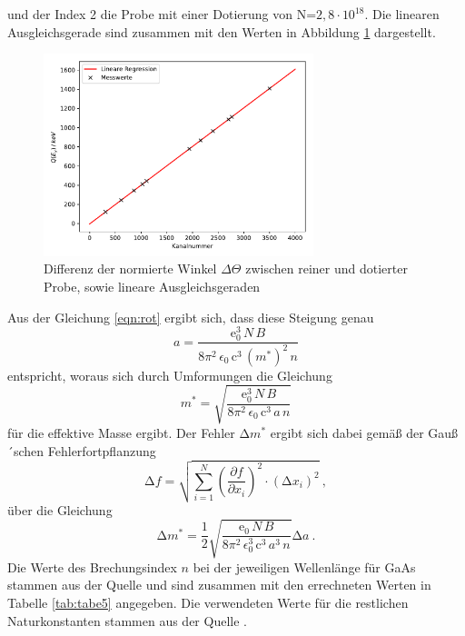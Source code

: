 und der Index 2 die Probe mit einer Dotierung von N=$2,8\cdot10^{18}$.
Die linearen Ausgleichsgerade sind zusammen mit den Werten in Abbildung \ref{fig:plot3}
dargestellt. \\
\begin{figure}
  \centering
  \includegraphics[width=0.7\textwidth]{plot3.pdf}
  \caption{Differenz der normierte Winkel $\Delta \Theta$
  zwischen reiner und dotierter Probe, sowie lineare Ausgleichsgeraden}
  \label{fig:plot3}
\end{figure}
Aus der Gleichung \eqref{eqn:rot} ergibt sich, dass diese Steigung genau
\begin{equation}
  a=\frac{\text{e}_0^3\,N\,B}{8\pi^2\,\epsilon_0\,\text{c}^3\,(m^*)^2\,n}
\end{equation}
entspricht, woraus sich durch Umformungen die Gleichung
\begin{equation}
  m^*=\sqrt{\frac{\text{e}_0^3\,N\,B}{8\pi^2\,\epsilon_0\,\text{c}^3\,a\,n}}
\end{equation}
für die effektive Masse ergibt.
Der Fehler $\increment m^*$ ergibt sich dabei gemäß der Gauß´schen Fehlerfortpflanzung
\begin{equation}
  \increment f = \sqrt{ \sum_{i=1}^N \left( \frac{\partial f}{\partial x_i}\right)^2
  \cdot (\increment x_i)^2  } \: ,
  \label{eqn:gaus}
\end{equation}
über die Gleichung
\begin{equation}
  \increment m^*=\frac{1}{2}\sqrt{\frac{\text{e}_0\,N\,B}{8\pi^2\,\epsilon_0^3\,\text{c}^3\,a^3\,n}}\increment a \: .
\end{equation}
Die Werte des Brechungsindex $n$ bei der jeweiligen Wellenlänge für GaAs
stammen aus der Quelle \cite{online1} und sind zusammen mit den errechneten Werten in Tabelle
\ref{tab:tabe5}  angegeben. Die verwendeten Werte für die restlichen Naturkonstanten stammen
aus der Quelle \cite{pdg}.
